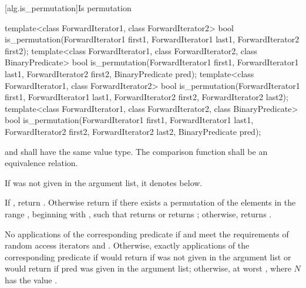 [alg.is_permutation]{Is permutation}

%
\begin{itemdecl}
template<class ForwardIterator1, class ForwardIterator2>
  bool is_permutation(ForwardIterator1 first1, ForwardIterator1 last1,
                      ForwardIterator2 first2);
template<class ForwardIterator1, class ForwardIterator2,
                 class BinaryPredicate>
  bool is_permutation(ForwardIterator1 first1, ForwardIterator1 last1,
                      ForwardIterator2 first2, BinaryPredicate pred);
template<class ForwardIterator1, class ForwardIterator2>
  bool is_permutation(ForwardIterator1 first1, ForwardIterator1 last1,
                      ForwardIterator2 first2, ForwardIterator2 last2);
template<class ForwardIterator1, class ForwardIterator2,
                 class BinaryPredicate>
  bool is_permutation(ForwardIterator1 first1, ForwardIterator1 last1,
                      ForwardIterator2 first2, ForwardIterator2 last2,
                      BinaryPredicate pred);
\end{itemdecl}

\begin{itemdescr}
\pnum
\requires {} and  shall have the same
value type. The comparison function shall be an equivalence relation.

\pnum
\remarks If  was not given in the argument list, it denotes
 below.

\pnum
\returns If , return .
Otherwise return  if there exists a permutation of the elements in the
range , beginning with , such that  returns  or
 returns ; otherwise, returns
.

\pnum
\complexity No applications of the corresponding predicate if 
and  meet the requirements of random access iterators and
.
Otherwise, exactly  applications of the
corresponding predicate if 
would return  if  was not given in the argument list
or  would return  if pred was given in the argument list; otherwise, at
worst , where $N$ has the value .
\end{itemdescr}

